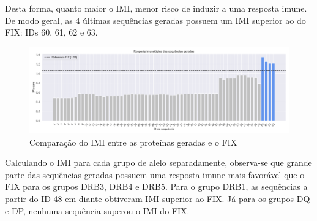 Desta forma, quanto maior o IMI, menor risco de induzir a uma resposta imune.
De modo geral, as 4 últimas sequências geradas possuem um IMI superior ao do FIX: IDs 60, 61, 62 e 63.

\begin{figure}[H]
    \centering
    \includegraphics[width=.9\linewidth]{figuras/plot_imuno_IMscore_geral.png}    
    \caption{Comparação do IMI entre as proteínas geradas e o FIX}
    \label{fig:immuno_tscore}
\end{figure}

Calculando o IMI para cada grupo de alelo separadamente, observa-se que grande parte das sequências geradas possuem uma resposta 
imune mais favorável que o FIX para os grupos DRB3, DRB4 e DRB5. 
Para o grupo DRB1, as sequências a partir do ID 48 em diante obtiveram IMI superior ao FIX. 
Já para os grupos DQ e DP, nenhuma sequência superou o IMI do FIX. 

